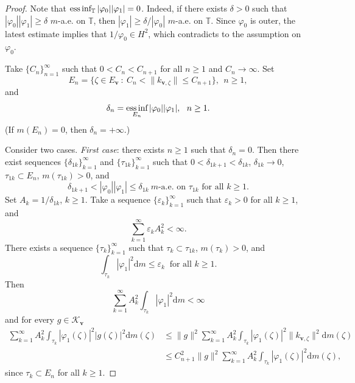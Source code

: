 \documentclass[a4paper,oneside,11pt]{amsart}
\numberwithin{equation}{section}
\theoremstyle{plain}
\theoremstyle{definition}
\begin{document}
\begin{proof} Note that $\mathop{\text{\rm ess\,inf}}_{\mathbb T}|\varphi_0||\varphi_1|=0$. 
Indeed, if there exists $\delta>0$ such that $|\varphi_0||\varphi_1|\geq \delta$  $m$-a.e. on $\mathbb T$, 
then $|\varphi_1|\geq \delta/|\varphi_0|$  $m$-a.e. on $\mathbb T$. Since $\varphi_0$ is outer, 
the latest estimate implies that $1/\varphi_0\in H^2$, which contradicts to the assumption on $\varphi_0$. 

Take $\{C_n\}_{n=1}^\infty$ such that $0<C_n<C_{n+1}$ for all $n\geq 1$ and $C_n\to\infty$. 
Set $$E_n=\{\zeta\in E_{\mathbf v}\ :\ C_n<\|k_{\mathbf v,\zeta}\|\leq C_{n+1}\}, \ \ n \geq 1,$$
and $$\delta_n =\mathop{\text{\rm ess\,inf}}_{E_n}|\varphi_0||\varphi_1|,\ \ n \geq 1.$$
(If $m(E_n)=0$, then $\delta_n=+\infty$.)

Consider two cases. \emph{First case}: there exists $n\geq 1$ such that $\delta_n=0$. Then 
there exist sequences $\{\delta_{1k}\}_{k=1}^\infty$ and $\{\tau_{1k}\}_{k=1}^\infty$ such that
 $0<\delta_{1k+1}<\delta_{1k}$, $\delta_{1k}\to 0$, $\tau_{1k}\subset E_n$, $m(\tau_{1k})>0$, 
and $$\delta_{1k+1}<|\varphi_0||\varphi_1|\leq\delta_{1k} \  m\text{-a.e. on }\tau_{1k} \text{ for all }k\geq 1. $$
Set $A_k=1/\delta_{1k}$, $k\geq 1$. Take a sequence $\{\varepsilon_k\}_{k=1}^\infty$ such that 
$\varepsilon_k>0$  for all $k\geq 1$, and 
\begin{equation}\label{aaepsilon} \sum_{k=1}^\infty\varepsilon_kA_k^2<\infty.\end{equation}
There  exists a sequence $\{\tau_k\}_{k=1}^\infty$ such that $\tau_k\subset\tau_{1k}$, $m(\tau_k)>0$, 
and $$\int_{\tau_k}|\varphi_1|^2{\mathrm d}m\leq\varepsilon_k \ \text{ for all }k\geq 1.$$
Then \begin{equation}\label{aavarphi1}  \sum_{k=1}^\infty A_k^2\int_{\tau_k}|\varphi_1|^2{\mathrm d}m<\infty\end{equation}
and for every $g\in\mathcal K_{\mathbf v}$ 
\begin{equation*}\begin{aligned} \sum_{k=1}^\infty   A_k^2\int_{\tau_k}|\varphi_1(\zeta)|^2|g(\zeta)|^2{\mathrm d}m(\zeta)  &
\leq \|g\|^2\sum_{k=1}^\infty A_k^2\int_{\tau_k}|\varphi_1(\zeta)|^2\|k_{\mathbf v,\zeta}\|^2{\mathrm d}m(\zeta) \\& 
\leq C_{n+1}^2\|g\|^2\sum_{k=1}^\infty A_k^2\int_{\tau_k}|\varphi_1(\zeta)|^2{\mathrm d}m(\zeta),\end{aligned}\end{equation*}
since $\tau_k\subset E_n$ for all $k\geq 1$. 


\end{proof}
\end{document}
